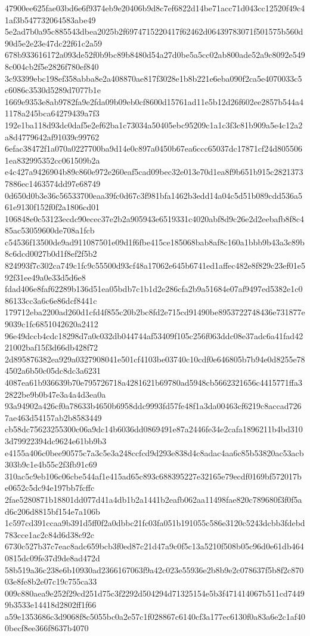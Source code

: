 {47900ee625fae03bd6e6f9374eb9e20406b9d8c7ef6822d14be71acc71d043cc12520f49c41af3b547732064583abe49
5e2ad7b0a95c885543dbea2025b2f6974715220417f62462d06439783071f501575b560d90d5e2e23e47dc22f61c2a59
678b933616172a093de52f0b9bc89b8480d54a27d0be5a5cc02ab800ade52a9c8092e5498c004cb2f5e2826f780ef840
3c93399ebc198ef358abba8e2a408870ae817f3028e1b8b221e6eba090f2ca5e4070033c5c6086c3530d5289d7077b1e
1669e9353e8ab9782fa9e2fda09b09eb0cf8600d15761ad11e5b12d26f602ee2857b544a41178a245bca64279439a7f3
192e1ba118d93dc0daf5e2ef62ba1c73034a50405ebc95209c1a1c3f3c81b909a5e4c12a2a8d4779642af91039c99762
6efac38472f1a070a0227700ba9d14e0c897a0450b67ea6ccc65037dc17871cf24d8055061ea832995352cc061509b2a
e4c427a9426904b89c860e972e260eaf5cad09bec32e013e70d1ea8f9b651b915c28213737886ec1463574dd97e68749
0d650d0b3e36c56533700eaa39fc0d67c3f981bfa1462b3edd14a04c5d51b089cdd536a561e9130f152f0f2a1806cd01
106848e0c53123ecdc90ecec37e2b2a905943e6519331c4020abf8d9c26e2d2eebafb8f8c485ac53059600de708a1fcb
c54536f13500de9ad911087501e09d1f6fbe415ce185068bab8af8c160a1bbb9b43a3c89b8c6dcd0027b0d1f8ef2f5b2
824993f7c302ca749c1fc9c55500d93cf48a17062e645b6741ed1affec482e8f829c23ef01e592f31ee49a0e33d5d6e8
fdad406e8faf62289b136d51ea05bdb7c1b1d2e286cfa2b9a51684e07af9497ed5382e1c086133cc3a6c6e86dcf8441c
179712eba2200ad260d1cfd4f855c20b2bc8fd2e715cd91490be8953722748436e731877e9039c1fc6851042620a2412
96e49dccb4cdc18298d7a0c032db044744af53409f105c256f063ddc08e37adc6a41fad4221002baf15f3d66db428f72
2d895876382ea929a0327908041e501cf4103be03740c10cdf0e646805b7b94e0d8255e784502a6b50c05dc8dc3a6231
4087ea61b936639b70e795726718a4281621b69780ad5948cb5662321656c4415771ffa32822be9b0b47e3a4a4d3ea0a
93a94902a426cf0a78633b4650b6958ddc9993fd57fe48f1a3da00463cf6219c8accad7267ae463d54157ab2b8583449
cb58dc75623255300c06a9dc14b6036dd0869491e87a2446fe34e2cafa1896211b4bd3103d79922394dc9624e61bb9b3
e4155a406c0bee90575c7a3c5e3a248ccfcd9d293e838d4c8adac4aa6c85b53820ac53acb303b9c1e4b55c2f3fb91c69
310ac5c9eb106c06cbe544af1e415ad65c893c688395227e32165e79ecdf0169bf572017be0652c5dc94e197bb7fcffc
2fae5280871b18801dd077d41a4db1b2a1441b2eafb062aa11498fae820c789680f3f0f5ad6c206d8815bf154e7a106b
1c597cd391ccaa9b391d5ff0f2a0dbbc21fc03fa051b191055c586e3120c5243dcbb3fdebd783cce1ac2c84d6d38c92c
6730c527b37c7eac8adc659bcb3f0ed87c21d47a9c0f5c13a5210f508b05c96d0e61db4640815dc09fe37d9de8ad472d
58b519a36c238e6b10930ad2366167063f9a42c023e55936e2b8b9e2c078637f5b8f2c87003e8fe8b2e07c19c755ca33
009c880aea9e252f29cd251d75c3f2292d504294d71325154e5b3f471414067b511cd74499b3533e14418d2802ff1f66
a59e1353686c3d9068f8c5055bc0a2e57c1f028867c6140cf3a177ec6130f0a83a6e2c1af400becf8ee366f8637b4070
}

